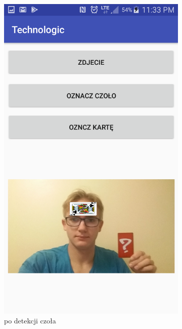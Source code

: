 \begin{figure}[H]
\begin{subfigure}{0.25\textwidth}
        \includegraphics[width=\linewidth]{imgs/czolo.png}
        \caption{po detekcji czoła}
        \label{fig:zdjecieCzolo}
    \end{subfigure}\hfill
    \begin{subfigure}{0.25\textwidth}
        \centering

\end{subfigure}
\end{figure}

